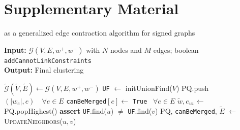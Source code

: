 
\section{Supplementary Material}

\begin{algorithm}
  \caption{\algname{} as a generalized edge contraction algorithm for signed graphs}
\hspace*{\algorithmicindent} \textbf{Input:} $\mathcal{G}(V,E,w^+,w^-)$ with $N$ nodes and $M$ edges; boolean \texttt{{\color{blue}addCannotLinkConstraints}} \\
\hspace*{\algorithmicindent} \textbf{Output:} Final clustering \\
  \hspace*{\algorithmicindent} 
  \begin{algorithmic}[1]
      \State $\tilde{\mathcal{G}}(\tilde{V},\tilde{E}) \gets \mathcal{G}(V,E,w^+,w^-)$  
      \State \texttt{UF} $\gets$ initUnionFind($V$) 
        \State PQ.push$(|w_e|, e) \quad \forall e \in E $  
        \State \texttt{canBeMerged}$[e] \gets$ \texttt{True} $\,\,\, \forall e\in E$ 
    \State
        \State $\tilde{w}, e_{uv} \gets $ PQ.popHighest() 
        \State \textbf{assert} \texttt{UF}.find($u$) $\neq$ \texttt{UF}.find($v$) 
          \State PQ, \texttt{canBeMerged}, $\tilde{E}$ $\gets$ \textsc{UpdateNeighbors}($u,v$)
          

\end{algorithmic}
\end{algorithm}
